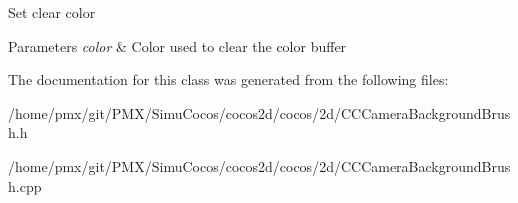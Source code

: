 Set clear color 
\begin{DoxyParams}{Parameters}
{\em color} & Color used to clear the color buffer \\
\hline
\end{DoxyParams}


The documentation for this class was generated from the following files\+:\begin{DoxyCompactItemize}
\item 
/home/pmx/git/\+P\+M\+X/\+Simu\+Cocos/cocos2d/cocos/2d/C\+C\+Camera\+Background\+Brush.\+h\item 
/home/pmx/git/\+P\+M\+X/\+Simu\+Cocos/cocos2d/cocos/2d/C\+C\+Camera\+Background\+Brush.\+cpp\end{DoxyCompactItemize}
